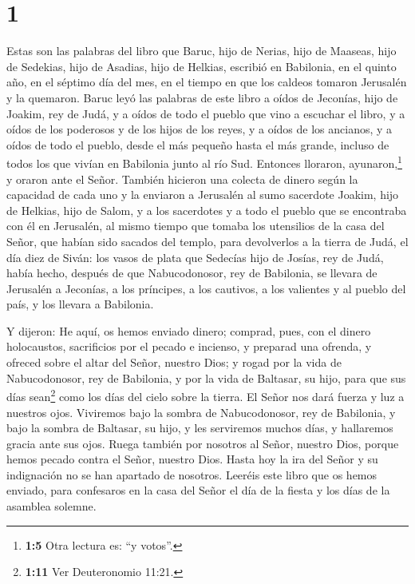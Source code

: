 \hypertarget{section}{%
\section{1}\label{section}}

 Estas son las palabras del libro que Baruc, hijo de
Nerias, hijo de Maaseas, hijo de Sedekias, hijo de Asadias, hijo de
Helkias, escribió en Babilonia,  en el quinto año, en el
séptimo día del mes, en el tiempo en que los caldeos tomaron Jerusalén y
la quemaron.  Baruc leyó las palabras de este libro a
oídos de Jeconías, hijo de Joakim, rey de Judá, y a oídos de todo el
pueblo que vino a escuchar el libro,  y a oídos de los
poderosos y de los hijos de los reyes, y a oídos de los ancianos, y a
oídos de todo el pueblo, desde el más pequeño hasta el más grande,
incluso de todos los que vivían en Babilonia junto al río Sud.
 Entonces lloraron, ayunaron,\footnote{\textbf{1:5} Otra
  lectura es: ``y votos''.} y oraron ante el Señor. 
También hicieron una colecta de dinero según la capacidad de cada uno
 y la enviaron a Jerusalén al sumo sacerdote Joakim, hijo
de Helkias, hijo de Salom, y a los sacerdotes y a todo el pueblo que se
encontraba con él en Jerusalén,  al mismo tiempo que
tomaba los utensilios de la casa del Señor, que habían sido sacados del
templo, para devolverlos a la tierra de Judá, el día diez de Siván: los
vasos de plata que Sedecías hijo de Josías, rey de Judá, había hecho,
 después de que Nabucodonosor, rey de Babilonia, se
llevara de Jerusalén a Jeconías, a los príncipes, a los cautivos, a los
valientes y al pueblo del país, y los llevara a Babilonia.

 Y dijeron: He aquí, os hemos enviado dinero; comprad,
pues, con el dinero holocaustos, sacrificios por el pecado e incienso, y
preparad una ofrenda, y ofreced sobre el altar del Señor, nuestro Dios;
 y rogad por la vida de Nabucodonosor, rey de Babilonia,
y por la vida de Baltasar, su hijo, para que sus días sean\footnote{\textbf{1:11}
  Ver Deuteronomio 11:21.} como los días del cielo sobre la tierra.
 El Señor nos dará fuerza y luz a nuestros ojos.
Viviremos bajo la sombra de Nabucodonosor, rey de Babilonia, y bajo la
sombra de Baltasar, su hijo, y les serviremos muchos días, y hallaremos
gracia ante sus ojos.  Ruega también por nosotros al
Señor, nuestro Dios, porque hemos pecado contra el Señor, nuestro Dios.
Hasta hoy la ira del Señor y su indignación no se han apartado de
nosotros.  Leeréis este libro que os hemos enviado, para
confesaros en la casa del Señor el día de la fiesta y los días de la
asamblea solemne.

